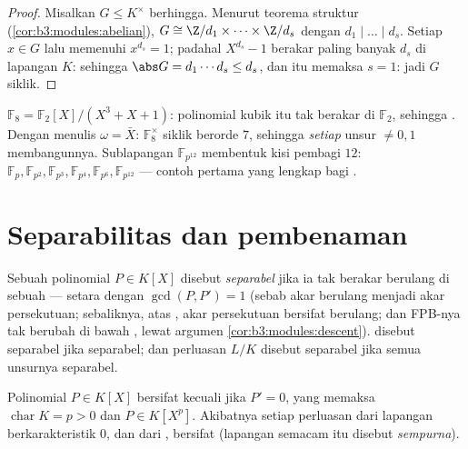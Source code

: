 \begin{proof}
Misalkan $G \leq K^\times$ berhingga. Menurut teorema struktur
(\cref{cor:b3:modules:abelian}), $G \cong \Z/d_1 \times \dots
\times \Z/d_s$ dengan $d_1 \mid \dots \mid d_s$. Setiap $x \in G$
lalu memenuhi $x^{d_s} = 1$; padahal $X^{d_s} - 1$ berakar paling banyak
$d_s$ di lapangan $K$: sehingga $\abs G = d_1\cdots d_s \leq d_s$,
dan itu memaksa $s = 1$: jadi $G$ siklik.
\end{proof}

\begin{example}\label{ex:b3:galois:f8}
$\mathbb F_8 = \mathbb F_2[X]/(X^3 + X + 1)$: polinomial kubik itu tak
berakar di $\mathbb F_2$, sehingga . Dengan menulis $\omega =
\bar X$: $\mathbb F_8^\times$ siklik berorde $7$, sehingga
\emph{setiap} unsur $\neq 0, 1$ membangunnya. Sublapangan
$\mathbb F_{p^{12}}$ membentuk kisi pembagi $12$:
$\mathbb F_p, \mathbb F_{p^2}, \mathbb F_{p^3}, \mathbb F_{p^4},
\mathbb F_{p^6}, \mathbb F_{p^{12}}$ --- contoh pertama yang lengkap
bagi .
\end{example}

\section{Separabilitas dan pembenaman}

\begin{definition}\label{def:b3:galois:separable}
Sebuah polinomial $P \in K[X]$ disebut \emph{separabel} jika ia tak berakar berulang di sebuah  ---
setara dengan $\gcd(P, P') = 1$ (sebab akar berulang menjadi akar
persekutuan; sebaliknya, atas , akar persekutuan bersifat
berulang; dan FPB-nya tak berubah di bawah , lewat
argumen \cref{cor:b3:modules:descent}).  disebut
separabel jika  separabel; dan perluasan $L/K$ disebut
separabel jika semua unsurnya separabel.
\end{definition}

\begin{proposition}\label{prop:b3:galois:perfect}
Polinomial \emph{} $P \in K[X]$ bersifat  kecuali jika $P' = 0$,
yang memaksa $\operatorname{char} K = p > 0$ dan $P \in K[X^p]$.
Akibatnya setiap perluasan  dari lapangan berkarakteristik
$0$, dan dari , bersifat  (lapangan
semacam itu disebut \emph{sempurna}).
\end{proposition}


